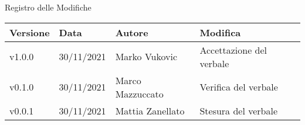\begin{center}
  \huge{Registro delle Modifiche}
\end{center}

\begin{center}
  \begin{tabular}{|p{2cm}|p{2cm}|p{3cm}|p{5cm}|}
    \hline
    \textbf{Versione} & \textbf{Data} & \textbf{Autore} & \textbf{Modifica}                    \\ \hline
    v1.0.0            & 30/11/2021    & Marko Vukovic   & Accettazione del verbale \\ \hline
    v0.1.0            & 30/11/2021    & Marco Mazzuccato   & Verifica del verbale \\ \hline
    v0.0.1            & 30/11/2021    & Mattia Zanellato   & Stesura del verbale \\ \hline
  \end{tabular}
\end{center}